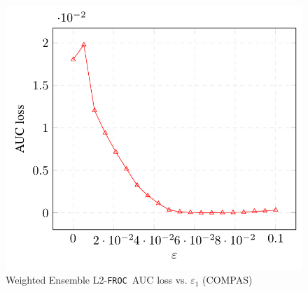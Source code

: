\documentclass{article}
\newcommand{\ouralgo}{\texttt{FROC}}
\begin{document}
\begin{figure}[!h]
    \centering
    \includegraphics[width=1\linewidth]{Images/WEL2_COMPAS_AUC.png}
    \caption{Weighted Ensemble L2-\ouralgo\ AUC loss vs. $\varepsilon_1$ (COMPAS)}
    \label{fig:WEL2_COMPAS_AUC}
\end{figure}


        
        
\end{document}
